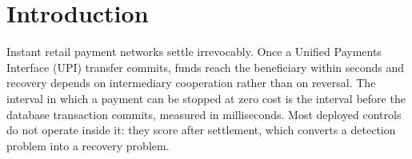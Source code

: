 \documentclass[conference]{IEEEtran}
\begin{document}
\section{Introduction}
\label{sec:introduction}

Instant retail payment networks settle irrevocably. Once a Unified
Payments Interface (UPI) transfer commits, funds reach the beneficiary
within seconds and recovery depends on intermediary cooperation rather
than on reversal. The interval in which a payment can be stopped at
zero cost is the interval before the database transaction commits,
measured in milliseconds. Most deployed controls do not operate inside
it: they score after settlement, which converts a detection problem
into a recovery problem.
\end{document}
